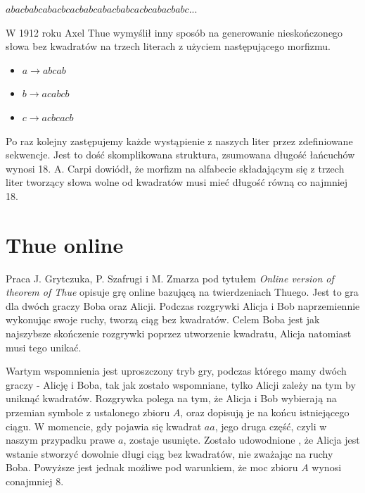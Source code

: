 \documentclass[document]{xmgr}
\begin{document}
{\centering $abacbabcabacbcacbabcabacbabcacbcabacbabc...$ \par}

W 1912 roku Axel Thue wymyślił inny sposób na generowanie nieskończonego słowa bez kwadratów na trzech literach z użyciem następującego morfizmu. 
\begin{itemize}
\item $a \to abcab$
\item $b \to acabcb$
\item $c \to acbcacb$
\end{itemize}


Po raz kolejny zastępujemy każde wystąpienie z naszych liter przez zdefiniowane sekwencje. Jest to dość skomplikowana struktura, zsumowana długość łańcuchów wynosi 18. A. Carpi \cite{carpi} dowiódł, że morfizm na alfabecie składającym się z trzech liter tworzący słowa wolne od kwadratów musi mieć długość równą co najmniej 18.

\section{Thue online}
Praca J. Grytczuka, P. Szafrugi i M. Zmarza pod tytułem \textit{Online version of theorem of Thue} \cite{thueonline} opisuje grę online bazującą na twierdzeniach Thuego. Jest to gra dla dwóch graczy Boba oraz Alicji. Podczas rozgrywki Alicja i Bob naprzemiennie wykonując swoje ruchy, tworzą ciąg bez kwadratów. Celem Boba jest jak najszybsze skończenie rozgrywki poprzez utworzenie kwadratu, Alicja natomiast musi tego unikać.

Wartym wspomnienia jest uproszczony tryb gry, podczas którego mamy dwóch graczy - Alicję i Boba, tak jak zostało wspomniane, tylko Alicji zależy na tym by uniknąć kwadratów. Rozgrywka polega na tym, że Alicja i Bob wybierają na przemian symbole z ustalonego zbioru $A$, oraz dopisują je na końcu istniejącego ciągu. W momencie, gdy pojawia się kwadrat $aa$, jego druga część, czyli w naszym przypadku prawe $a$, zostaje usunięte. Zostało udowodnione \cite{thueonline2}, że Alicja jest wstanie stworzyć dowolnie długi ciąg bez kwadratów, nie zważając na ruchy Boba. Powyższe jest jednak możliwe pod warunkiem, że moc zbioru $A$ wynosi conajmniej 8.
\end{document}
